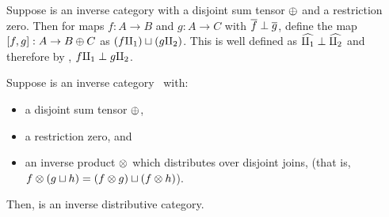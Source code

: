 \begin{definition}\label{def:join_of_perp_rst_maps}
  Suppose \X is an inverse category with a disjoint sum tensor $\oplus$ and a restriction zero. Then
  for maps $f:A \to B$ and $g:A \to C$ with $\overline{f} \perp \overline{g}$, define the map $[f,g]:A \to
  B\oplus C$ as $(f \amalg_{1}) \sqcup (g \amalg_{2})$. This is well defined as $\widehat{\amalg_{1}} \perp \widehat{\amalg_{2}}$ and
  therefore by , $f\amalg_{1} \perp g\amalg_{2}$.
\end{definition}

\begin{lemma}
  Suppose \X is an inverse category \X\ with:
  \begin{itemize}
    \item a disjoint sum tensor $\oplus$,
    \item a restriction zero, and
    \item an inverse  product $\otimes$ which distributes over disjoint joins, (that is,
      $f\otimes(g\sqcup h) = (f\otimes g) \sqcup (f\otimes h)$).
  \end{itemize}
  Then, \X is an inverse distributive  category.
\end{lemma}
